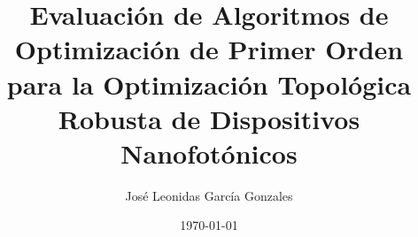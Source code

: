 \documentclass[a4paper, 12pt, oneside]{tesisutec}
\begin{document}
\frontmatter
{}

\title{Evaluación de Algoritmos de Optimización de Primer Orden para la Optimización Topológica Robusta de Dispositivos Nanofotónicos}
\author{José Leonidas García Gonzales}
\date{\today}

\maketitle
{}

%


\tableofcontents
\newpage
\listoftables
\newpage
\listoffigures


\mainmatter
\pagestyle{fancy}









%

\renewcommand{\bibname}{\large\bf{REFERENCIAS BIBLIOGRÁFICAS}}

%
\end{document}

